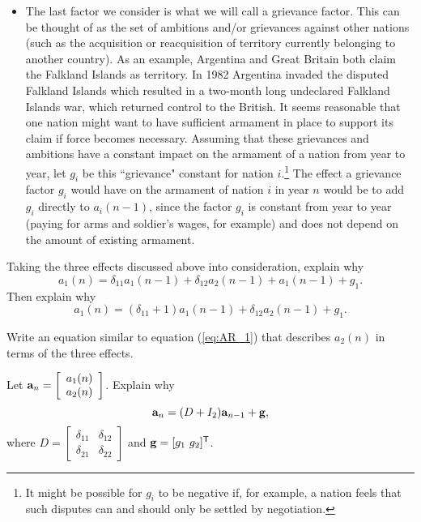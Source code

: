 \begin{pactivity}
\begin{itemize}
\item The last factor we consider is what we will call a grievance factor. This can be thought of as the set of ambitions and/or grievances against other nations (such as the acquisition or reacquisition of territory currently belonging to another country). As an example, Argentina and Great Britain both claim the Falkland Islands as territory. In 1982 Argentina invaded the disputed Falkland Islands which resulted in a two-month long undeclared Falkland Islands war, which returned control to the British. It seems reasonable that one nation might want to have sufficient armament in place to support its claim if force becomes necessary. Assuming that these grievances and ambitions have a constant impact on the armament of a nation from year to year, let $g_i$ be this ``grievance" constant for nation $i$.\footnote{It might be possible for $g_i$ to be negative if, for example, a nation feels that such disputes can and should only be settled by negotiation.} The effect a grievance factor $g_i$ would have on the armament of nation $i$ in year $n$ would be to add $g_i$ directly to $a_i(n-1)$, since the factor $g_i$ is constant from year to year (paying for arms and soldier's wages, for example) and does not depend on the amount of existing armament.

\end{itemize} 

\ba
\item  Taking the three effects discussed above into consideration, explain why  
\[a_1(n) = \delta_{11}a_1(n-1) + \delta_{12}a_2(n-1) + a_1(n-1) + g_1.\]
Then explain why 
\begin{equation} \label{eq:AR_1}
a_1(n) = \left(\delta_{11}+1\right)a_1(n-1) + \delta_{12}a_2(n-1) + g_1. 
\end{equation}

\item Write an equation similar to equation (\ref{eq:AR_1})  that describes $a_2(n)$ in terms of the three effects. \\


\item Let $\mathbf{a}_n = \left[ \begin{array}{ccc} a_1(n) \\ a_2(n)  \end{array} \right]$. Explain why 
\[\mathbf{a}_n = (D+I_2)\mathbf{a}_{n-1} + \mathbf{g},\]
where $D = \left[ \begin{array}{cc} \delta_{11}&\delta_{12} \\ \delta_{21}&\delta_{22} \end{array} \right]$ and $\mathbf{g} = [g_1 \ g_2]^{\mathsf{T}}$. 


\ea

\end{pactivity}

